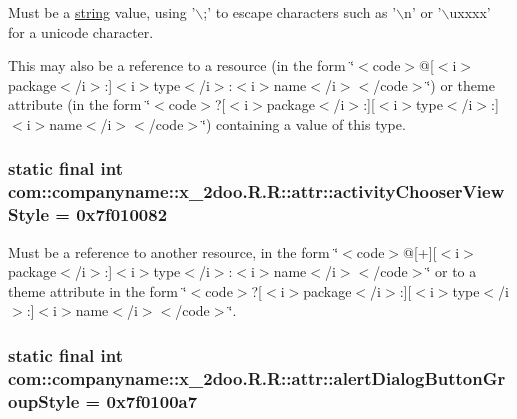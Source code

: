 Must be a \hyperlink{classcom_1_1companyname_1_1x__2doo_1_1_r_1_1string}{string} value, using '$\backslash$;' to escape characters such as '$\backslash$n' or '$\backslash$uxxxx' for a unicode character. 

This may also be a reference to a resource (in the form \char`\"{}$<$code$>$@\mbox{[}$<$i$>$package$<$/i$>$:\mbox{]}$<$i$>$type$<$/i$>$:$<$i$>$name$<$/i$>$$<$/code$>$\char`\"{}) or theme attribute (in the form \char`\"{}$<$code$>$?\mbox{[}$<$i$>$package$<$/i$>$:\mbox{]}\mbox{[}$<$i$>$type$<$/i$>$:\mbox{]}$<$i$>$name$<$/i$>$$<$/code$>$\char`\"{}) containing a value of this type. \hypertarget{classcom_1_1companyname_1_1x__2doo_1_1_r_1_1attr_4444d756ef9b2e891b50aa60451cc482}{
\subsubsection[{activityChooserViewStyle}]{\setlength{\rightskip}{0pt plus 5cm}static final int com::companyname::x\_\-2doo.R.R::attr::activityChooserViewStyle = 0x7f010082}}
\label{classcom_1_1companyname_1_1x__2doo_1_1_r_1_1attr_4444d756ef9b2e891b50aa60451cc482}


Must be a reference to another resource, in the form \char`\"{}$<$code$>$@\mbox{[}+\mbox{]}\mbox{[}$<$i$>$package$<$/i$>$:\mbox{]}$<$i$>$type$<$/i$>$:$<$i$>$name$<$/i$>$$<$/code$>$\char`\"{} or to a theme attribute in the form \char`\"{}$<$code$>$?\mbox{[}$<$i$>$package$<$/i$>$:\mbox{]}\mbox{[}$<$i$>$type$<$/i$>$:\mbox{]}$<$i$>$name$<$/i$>$$<$/code$>$\char`\"{}. \hypertarget{classcom_1_1companyname_1_1x__2doo_1_1_r_1_1attr_ef05b45a8e70767849d1da9e22615f23}{
\subsubsection[{alertDialogButtonGroupStyle}]{\setlength{\rightskip}{0pt plus 5cm}static final int com::companyname::x\_\-2doo.R.R::attr::alertDialogButtonGroupStyle = 0x7f0100a7}}
\label{classcom_1_1companyname_1_1x__2doo_1_1_r_1_1attr_ef05b45a8e70767849d1da9e22615f23}


